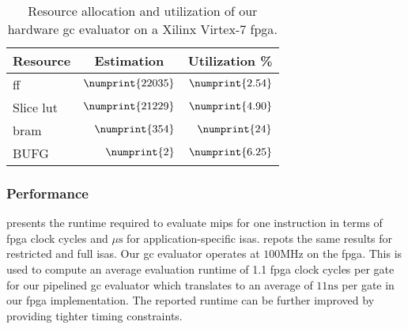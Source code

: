 \begin{table}
\centering
\caption{Resource allocation and utilization of our hardware \acrshort{gc} evaluator on a Xilinx Virtex-7 \acrshort{fpga}.}
\label{table:resource}
\begin{tabular}{l|r|r}
Resource    & \multicolumn{1}{c|}{Estimation} & \multicolumn{1}{c}{Utilization \%} \\ \hline \hline
\acrfull{ff} & $\numprint{22035}$ & $\numprint{2.54}$ \\ \hline
Slice \acrfull{lut} & $\numprint{21229}$ & $\numprint{4.90}$ \\ \hline
\acrshort{bram} & $\numprint{354}$ & $\numprint{24}$
\\ \hline
BUFG & $\numprint{2}$ & $\numprint{6.25}$
 \end{tabular}
\end{table}

\subsubsection{Performance}
 presents the runtime required to evaluate \gls{mips} for one instruction in terms of \acrshort{fpga} clock cycles and $\mu\textrm{s}$ for application-specific \acrshort{isa}s.
 repots the same results for restricted and full \acrshort{isa}s.
Our \acrshort{gc} evaluator operates at $100\textrm{MHz}$ on the \acrshort{fpga}.
This is used to compute an average evaluation runtime of 1.1 \acrshort{fpga} clock cycles per gate for our pipelined \acrshort{gc} evaluator which translates to an average of $11\textrm{ns}$ per gate in our \acrshort{fpga} implementation.
The reported runtime can be further improved by providing tighter timing constraints.

